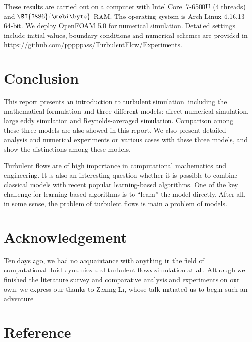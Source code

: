\documentclass[english, nochinese]{pkupaper}
\begin{document}
These results are carried out on a computer with Intel Core i7-6500U (4 threads) and $\SI{7886}{\mebi\byte}$ RAM. The operating system is Arch Linux 4.16.13 64-bit. We deploy OpenFOAM 5.0 \parencite{weller_tensorial_1998} for numerical simulation. Detailed settings include initial values, boundary conditions and numerical schemes are provided in \url{https://github.com/pppppass/TurbulentFlow/Experiments}.

\section{Conclusion} \label{Sec:Con}

This report presents an introduction to turbulent simulation, including the mathematical formulation and three different models: direct numerical simulation, large eddy simulation and Reynolds-averaged simulation. Comparison among these three models are also showed in this report. We also present detailed analysis and numerical experiments on various cases with these three models, and show the distinctions among these models.

Turbulent flows are of high importance in computational mathematics and engineering. It is also an interesting question whether it is possible to combine classical models with recent popular learning-based algorithms. One of the key challenge for learning-based algorithms is to ``learn'' the model directly. After all, in some sense, the problem of turbulent flows is main a problem of models.

\section{Acknowledgement} \label{Sec:Ack}

Ten days ago, we had no acquaintance with anything in the field of computational fluid dynamics and turbulent flows simulation at all. Although we finished the literature survey and comparative analysis and experiments on our own, we express our thanks to Zexing Li, whose talk initiated us to begin such an adventure.

\section{Reference}

\printbibliography
\end{document}
